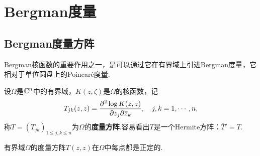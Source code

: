 \section{Bergman度量\label{sec3.5.1}}
\subsection{Bergman度量方阵}
Bergman核函数的重要作用之一，是可以通过它在有界域上引进Bergman度量，它相对于单位圆盘上的Poincar\'e度量.

设$\Omega$是$\mathbb C^n$中的有界域，$K(z,\zeta)$是$\Omega$的核函数，记
\[T_{jk}(z,z)=\frac{\partial^2 \log K(z,z)}{\partial z_j\partial {}\mkern1mu\overline{\mkern-1muz}_k},\quad j,k=1,\cdots,n,\]
称$T=(T_{jk})_{1\le j,k\le n}$为$\Omega$的\textbf{度量方阵}.容易看出$T$是一个Hermite方阵：$\bar{T}'=T$.
\begin{theorem}\label{thm3.5.1}
	有界域$\Omega$的度量方阵$T(z,z)$在$\Omega$中每点都是正定的.
\end{theorem}
